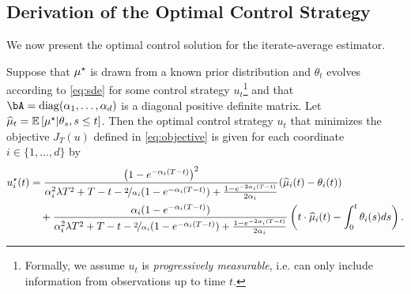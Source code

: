 \subsection{Derivation of the Optimal Control Strategy}\label{ssec:derivation}
We now present the optimal control solution for the iterate-average estimator.
\begin{theorem}\label{thm:optimal_control_solution}
    Suppose that $\mu^{\star}$ is drawn from a known prior distribution and $\theta_t$ evolves according to \eqref{eq:sde} for some control strategy $u_t$\footnote{Formally, we assume $u_t$ is \emph{progressively measurable}, i.e. can only include information from observations up to time $t$.} and that $\bA = \diag(\alpha_1, \dots, \alpha_d)$ is a diagonal positive definite matrix.  Let $\widehat{\mu}_t = \mathbb{E}\left[ \mu^{\star} | \theta_s, s \leq t \right]$.  Then the optimal control strategy $u_t$ that minimizes the objective $J_T(u)$ defined in \eqref{eq:objective} is given for each coordinate $i \in \{1, \dots, d\}$ by
    \begin{align}\label{eq:optimal_control_solution}
        u^{\star}_i(t) &= \frac{\left( 1 - e^{- \alpha_i (T - t)} \right)^2}{\alpha_i^2 \lambda T^2 + T - t - \nicefrac{2}{ \alpha_i} (1 - e^{- \alpha_i (T - t)}) + \frac{1 - e^{- 2 \alpha_i (T - t)}}{2 \alpha_i}} (\widehat{\mu}_i(t) - \theta_i(t)) \\
        &\quad + \frac{\alpha_i(1 - e^{- \alpha_i (T - t)})}{\alpha_i^2 \lambda T^2 + T - t - \nicefrac{2}{ \alpha_i} (1 - e^{- \alpha_i (T - t)}) + \frac{1 - e^{- 2 \alpha_i (T - t)}}{2 \alpha_i}} \left( t \cdot \widehat{\mu}_i(t) - \int_0^t \theta_i(s) d s \right).
    \end{align}
\end{theorem}
